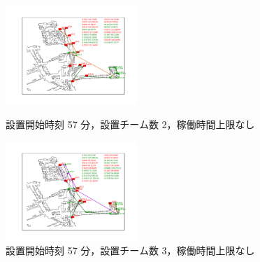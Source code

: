 \documentclass[a4paper,12pt,fleqn]{jarticle}
\begin{document}
\begin{figure}
 \begin{center}
  \begin{minipage}{0.49\hsize}
   \begin{center}
    \includegraphics[width=5cm,trim=100 50 100 50]{fig/57min_2team_nolim.pdf}
    \caption{設置開始時刻 57 分，\newline \quad 設置チーム数 2，稼働時間上限なし}
    \label{fig:57min_2team_nolim}
   \end{center}
  \end{minipage}
  \begin{minipage}{0.49\hsize}
   \begin{center}
    \includegraphics[width=5cm,trim=100 50 100 50]{fig/57min_3team_nolim.pdf}
    \caption{設置開始時刻 57 分，\newline \quad 設置チーム数 3，稼働時間上限なし}
    \label{fig:57min_3team_nolim}
   \end{center}
  \end{minipage}
 \end{center}
\end{figure}
\end{document}
